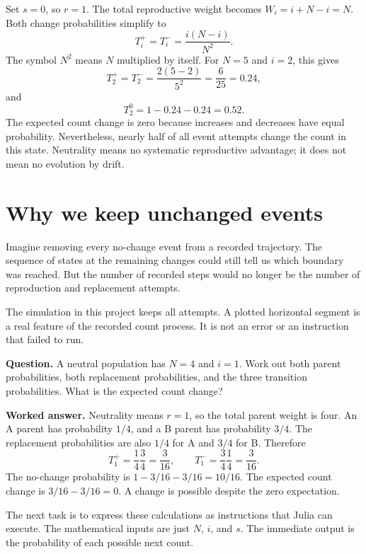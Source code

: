 Set \(s=0\), so \(r=1\). The total reproductive weight becomes
\(W_i=i+N-i=N\). Both change probabilities simplify to
\[
  T_i^+=T_i^-=\frac{i(N-i)}{N^2}.
\]
The symbol \(N^2\) means \(N\) multiplied by itself. For \(N=5\) and
\(i=2\), this gives
\[
  T_2^+=T_2^-=\frac{2(5-2)}{5^2}=\frac{6}{25}=0.24,
\]
and
\[
  T_2^0=1-0.24-0.24=0.52.
\]
The expected count change is zero because increases and decreases have equal
probability. Nevertheless, nearly half of all event attempts change the
count in this state. Neutrality means no systematic reproductive advantage;
it does not mean no evolution by drift.

\section{Why we keep unchanged events}

Imagine removing every no-change event from a recorded trajectory. The
sequence of states at the remaining changes could still tell us which
boundary was reached. But the number of recorded steps would no longer be
the number of reproduction and replacement attempts.

The simulation in this project keeps all attempts. A plotted horizontal
segment is a real feature of the recorded count process. It is not an error
or an instruction that failed to run.

\begin{checkpoint}
\textbf{Question.} A neutral population has \(N=4\) and \(i=1\). Work
out both parent probabilities, both replacement probabilities, and the three
transition probabilities. What is the expected count change?

\textbf{Worked answer.} Neutrality means \(r=1\), so the total parent
weight is four. An A parent has probability \(1/4\), and a B parent has
probability \(3/4\). The replacement probabilities are also \(1/4\) for A
and \(3/4\) for B. Therefore
\[
 T_1^+=\frac14\frac34=\frac{3}{16},\qquad
 T_1^-=\frac34\frac14=\frac{3}{16}.
\]
The no-change probability is
\(1-3/16-3/16=10/16\). The expected count change is
\(3/16-3/16=0\). A change is possible despite the zero expectation.
\end{checkpoint}

The next task is to express these calculations as instructions that Julia
can execute. The mathematical inputs are just \(N\), \(i\), and \(s\).
The immediate output is the probability of each possible next count.
